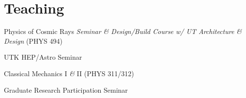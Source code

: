 \documentclass[11pt,letterpaper]{article}
\begin{document}


\section*{Teaching}

  \begin{itemizetighter}
    \item Physics of Cosmic Rays \emph{Seminar \& Design/Build Course w/ UT Architecture \& Design} (PHYS 494) 
    \item UTK HEP/Astro Seminar    
    \item Classical Mechanics I \textit{\&} II (PHYS 311/312) 
    \item Graduate Research Participation Seminar  
  \end{itemizetighter}
\end{document}
